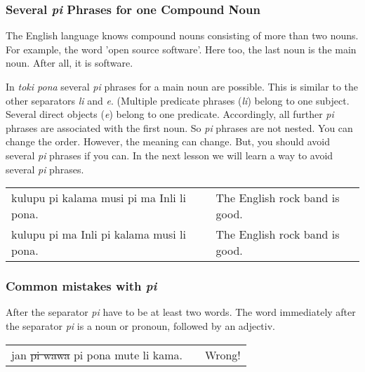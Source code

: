 %
\subsubsection*{Several \textit{pi} Phrases for one Compound Noun} 
%

The English language knows compound nouns consisting of more than two nouns. 
For example, the word 'open source software'.  
Here too, the last noun is the main noun. 
After all, it is software. 

In \textit{toki pona} several \textit{pi} phrases for a main noun are possible. 
This is similar to the other separators \textit{li} and \textit{e}. 
(Multiple predicate phrases (\textit{li}) belong to one subject. 
Several direct objects (\textit{e}) belong to one predicate.
Accordingly, all further \textit{pi} phrases are associated with the first noun. 
So \textit{pi} phrases are not nested. 
You can change the order. 
However, the meaning can change. 
But, you should avoid several \textit{pi} phrases if you can. 
In the next lesson we will learn a way to avoid several \textit{pi} phrases.

\begin{supertabular}{p{5,5cm}|ll}
kulupu pi kalama musi pi ma Inli li pona. &&  The English rock band is good. \\ 
kulupu pi ma Inli pi kalama musi li pona. &&  The English rock band is good. \\ 
\end{supertabular}

% 
\newpage
%
\subsubsection*{Common mistakes with \textit{pi}}
\label{'mistakes_with_pi'}
%

After the separator \textit{pi} have to be at least two words. 
The word immediately after the separator \textit{pi} is a noun or pronoun, followed by an adjectiv.

\begin{supertabular}{p{5,5cm}|ll}
jan \sout{pi wawa} pi pona mute li kama. && Wrong! \\ %
\end{supertabular}

